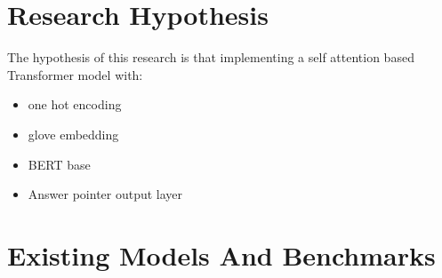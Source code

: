\documentclass[a4paper,12pt]{report}
\begin{document}
    \section{Research Hypothesis}\label{c33}
    The hypothesis of this research is that implementing a self attention based Transformer model with:
    \begin{itemize}
    	\item one hot encoding
    	\item glove embedding
    	\item BERT base\cite{bert}
    	\item Answer pointer output layer\cite{lstmPointer, lstmhu2016question}

    \end{itemize}
    \section{Existing Models And Benchmarks}\label{c34}
\end{document}
